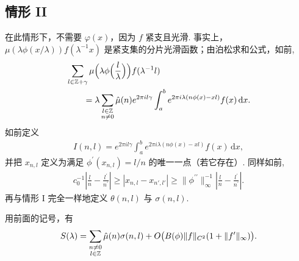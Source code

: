 \subsection{情形 II}

在此情形下，不需要 $\varphi(x)$，因为 $f$ 紧支且光滑. 事实上，$\mu(\lambda\phi(x/\lambda))f(\lambda^{-1}x)$ 是紧支集的分片光滑函数；由泊松求和公式，如前,
\begin{align*}
  &\sum_{l\in\mathbb{Z}+\gamma}\mu\Big(\lambda\phi\Big(\frac{l}{\lambda}\Big)\Big)f(\lambda^{-1}l)\\
  &\qquad=\lambda\sum_{\substack{l\in\mathbb{Z}\\ n\neq 0}}\hat{\mu}(n)e^{2\pi i l\gamma}
   \int_{a}^{b}e^{2\pi i\lambda(n\phi(x)-x l)}f(x)\,\mathrm{d}x.
\end{align*}
如前定义
\begin{align*}
  I(n,l)=e^{2\pi i l\gamma}\int_{a}^{b}e^{2\pi i\lambda(n\phi(x)-x l)}f(x)\,\mathrm{d}x,
\end{align*}
并把 $x_{n,l}$ 定义为满足 $\phi^{\prime}(x_{n,l})=l/n$ 的唯一一点（若它存在）. 同样如前,
\begin{align*}
  c_{0}^{-1}\left|\frac{l}{n}-\frac{l^{\prime}}{n^{\prime}}\right|
  \geq|x_{n,l}-x_{n',l'}|
  \geq\|\phi^{\prime\prime}\|_{\infty}^{-1}\left|\frac{l}{n}-\frac{l^{\prime}}{n^{\prime}}\right|.
\end{align*}
再与情形 I 完全一样地定义 $\theta(n,l)$ 与 $\sigma(n,l)$.

\begin{theorem}\label{thm:9.9}
用前面的记号，有
\begin{align*}
  S(\lambda)=\sum_{\substack{n\neq 0\\ l\in\mathbb{Z}}}\hat{\mu}(n)\sigma(n,l)
  +O\bigl(B(\phi)\|f\|_{C^{2}}(1+\|f^{\prime}\|_{\infty})\bigr).
\end{align*}
\end{theorem}


